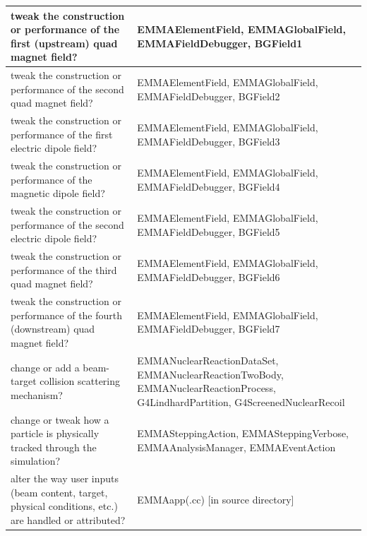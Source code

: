 \documentclass{article}
\begin{document}
\begin{longtable}[c]{|p{6 cm}|p{6 cm}|}
tweak the construction or performance of the first (upstream) quad magnet field?                       & EMMAElementField, EMMAGlobalField, EMMAFieldDebugger, BGField1                                                                   \\ \hline
tweak the construction or performance of the second quad magnet field?                                 & EMMAElementField, EMMAGlobalField, EMMAFieldDebugger, BGField2                                                                   \\ \hline
tweak the construction or performance of the first electric dipole field?                              & EMMAElementField, EMMAGlobalField, EMMAFieldDebugger, BGField3                                                                   \\ \hline
tweak the construction or performance of the magnetic dipole field?                                    & EMMAElementField, EMMAGlobalField, EMMAFieldDebugger, BGField4                                                                   \\ \hline
tweak the construction or performance of the second electric dipole field?                             & EMMAElementField, EMMAGlobalField, EMMAFieldDebugger, BGField5                                                                   \\ \hline
tweak the construction or performance of the third quad magnet field?                                  & EMMAElementField, EMMAGlobalField, EMMAFieldDebugger, BGField6                                                                   \\ \hline
tweak the construction or performance of the fourth (downstream) quad magnet field?                    & EMMAElementField, EMMAGlobalField, EMMAFieldDebugger, BGField7                                                                   \\ \hline
change or add a beam-target collision scattering mechanism?                                            & EMMANuclearReactionDataSet, EMMANuclearReactionTwoBody, EMMANuclearReactionProcess, G4LindhardPartition, G4ScreenedNuclearRecoil \\ \hline
change or tweak how a particle is physically tracked through the simulation?                           & EMMASteppingAction, EMMASteppingVerbose, EMMAAnalysisManager, EMMAEventAction                                                    \\ \hline
alter the way user inputs (beam content, target, physical conditions, etc.) are handled or attributed? & EMMAapp(.cc) {[}in source directory{]}                                                                                           \\ \hline

\end{longtable}
\end{document}
